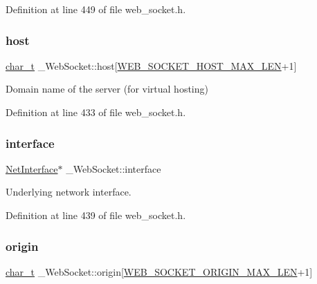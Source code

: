 Definition at line 449 of file web\+\_\+socket.\+h.

\mbox{\label{struct__WebSocket_ad7852664f96e591e8b4a31283dfa0852}} 
\subsubsection{\texorpdfstring{host}{host}}
{\footnotesize\ttfamily \hyperlink{compiler__port_8h_a40bb5262bf908c328fbcfbe5d29d0201}{char\+\_\+t} \+\_\+\+Web\+Socket\+::host\mbox{[}\hyperlink{web__socket_8h_ab0e0a872efe7a6badc10953d0fc24cd0}{W\+E\+B\+\_\+\+S\+O\+C\+K\+E\+T\+\_\+\+H\+O\+S\+T\+\_\+\+M\+A\+X\+\_\+\+L\+EN}+1\mbox{]}}



Domain name of the server (for virtual hosting) 



Definition at line 433 of file web\+\_\+socket.\+h.

\mbox{\label{struct__WebSocket_a476f25b02cd35cc337db0f56529caa8e}} 
\subsubsection{\texorpdfstring{interface}{interface}}
{\footnotesize\ttfamily \hyperlink{net_8h_a2234db8911a1148c9159979d8f5e0d6b}{Net\+Interface}$\ast$ \+\_\+\+Web\+Socket\+::interface}



Underlying network interface. 



Definition at line 439 of file web\+\_\+socket.\+h.

\mbox{\label{struct__WebSocket_abaa9ad9f96c6d5727c3c38608d549fce}} 
\subsubsection{\texorpdfstring{origin}{origin}}
{\footnotesize\ttfamily \hyperlink{compiler__port_8h_a40bb5262bf908c328fbcfbe5d29d0201}{char\+\_\+t} \+\_\+\+Web\+Socket\+::origin\mbox{[}\hyperlink{web__socket_8h_a5c93d131ef16f066ea2c64453dcc52aa}{W\+E\+B\+\_\+\+S\+O\+C\+K\+E\+T\+\_\+\+O\+R\+I\+G\+I\+N\+\_\+\+M\+A\+X\+\_\+\+L\+EN}+1\mbox{]}}



